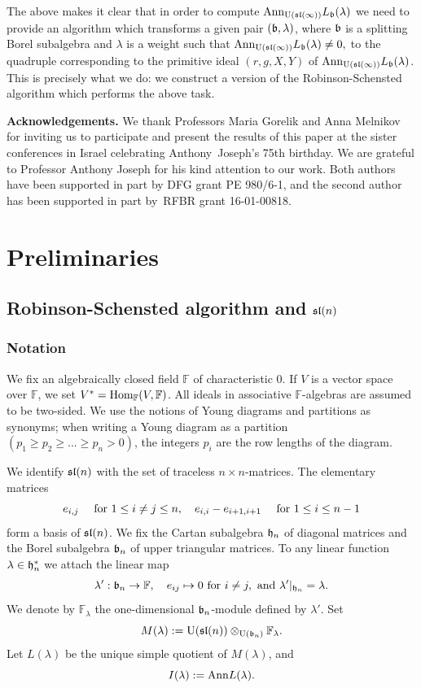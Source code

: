 \documentclass[10pt]{amsart}\oddsidemargin -1mm \evensidemargin -1mm \topmargin -15mm\headheight5mm \headsep 3.5mm \textheight 245mm\textwidth 170mm
\theoremstyle{definition}\newtheorem{theorem}{Theorem}[section]\newtheorem{lemma}[theorem]{Lemma}\newtheorem{remark}[theorem]{Remark}\newtheorem{proposition}[theorem]{Proposition}\newtheorem{corollary}[theorem]{Corollary}\newtheorem{definition}[theorem]{Definition}\newtheorem{Ex}[theorem]{Example}\newtheorem{obs}[theorem]{Observation}\newtheorem{nota}[theorem]{Notation}
\begin{document}
The above makes it clear that in order to compute ${\rm Ann}_{{\rm U}(\frak{sl}(\infty))}L_\frak b(\lambda)$ we need to provide an algorithm which transforms a given pair $(\frak b, \lambda)$, where $\frak b$ is a splitting Borel subalgebra and $\lambda$ is a weight such that ${\rm Ann}_{{\rm U}(\frak{sl}(\infty))} L_\frak b(\lambda)\ne 0,$ to the quadruple corresponding to the primitive ideal $(r, g, {X}, {Y})$ of ${\rm Ann}_{{\rm U}(\frak{sl}(\infty))}L_\frak b(\lambda)$. 
This is precisely what we do: we construct a version of the Robinson-Schensted algorithm which performs the above task.

{\bf Acknowledgements.} 
We thank Professors Maria Gorelik and Anna Melnikov for inviting us to participate and present the results of this paper at the sister conferences in Israel celebrating Anthony~Joseph's 75th birthday. 
We are grateful to Professor Anthony Joseph for his kind attention to our work. 
Both authors have been supported  in part by DFG grant PE 980/6-1, and the second author has been supported in part by~RFBR grant 16-01-00818.

\section{Preliminaries}
\subsection{Robinson-Schensted algorithm and $\frak{sl}(n)$}\label{Sprsl}
\subsubsection{Notation}
We fix an algebraically closed field $\mathbb F$ of characteristic 0. 
If $V$ is a vector space over $\mathbb F$, we set $V^*={\rm Hom}_{\mathbb F}(V, \mathbb F)$. 
All ideals in associative $\mathbb F$-algebras are assumed to be two-sided. 
We use the notions of Young diagrams and partitions as synonyms; when writing a Young diagram as a partition $(p_1\ge p_2\ge...\ge p_n>0)$, the integers $p_i$ are the row lengths of the diagram. 

We identify $\frak{sl}(n)$ with the set of traceless $n\times n$-matrices. 
The elementary matrices $$e_{i, j}\hspace{10pt}{\rm~for~}1\le i\ne j\le n,\hspace{10pt}e_{i, i}-e_{i+1, i+1}\hspace{10pt}{\rm~for~}1\le i\le n-1$$ 
form a basis of $\frak{sl}(n)$. 
We fix the Cartan subalgebra $\frak h_n$ of diagonal matrices and the Borel subalgebra $\frak b_n$ of upper triangular matrices. 
To any linear function $\lambda\in\frak h_n^*$ we attach the linear map
$$\lambda': \frak b_n\to\mathbb F,\hspace{10pt}e_{ij}\mapsto 0{\rm~for~}i\ne j,{\rm~and~}\lambda'|_{\frak h_n}=\lambda.$$
We denote by $\mathbb F_\lambda$ the one-dimensional $\frak b_n$-module defined by $\lambda'$. 
Set
$$M(\lambda):={\rm U}(\frak{sl}(n))\otimes_{{\rm U}(\frak b_n)}\mathbb F_\lambda.$$
Let $L(\lambda)$ be the unique simple quotient of $M(\lambda)$, and
$$I(\lambda):={\rm Ann} L(\lambda).$$
\end{document}
